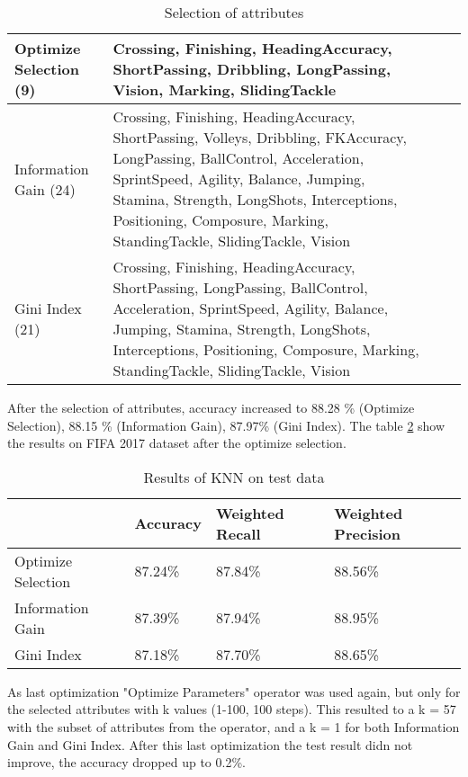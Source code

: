 \begin{table}[]
\begin{tabular}{p{3.5cm}|p{7.5cm}l|l}
\hline 
Optimize Selection (9) & Crossing, Finishing, HeadingAccuracy, ShortPassing, Dribbling, LongPassing, Vision, Marking, SlidingTackle \vspace{0.5cm}\\ 
\hline 
Information Gain (24)& Crossing, Finishing, HeadingAccuracy, ShortPassing, Volleys, Dribbling, FKAccuracy, LongPassing, BallControl, Acceleration, SprintSpeed, Agility, Balance, Jumping, Stamina, Strength, LongShots, Interceptions, Positioning, Composure, Marking, StandingTackle, SlidingTackle, Vision \vspace{0.5cm}\\ 
\hline 
Gini Index (21) & Crossing, Finishing, HeadingAccuracy, ShortPassing, LongPassing, BallControl, Acceleration, SprintSpeed, Agility, Balance, Jumping, Stamina, Strength, LongShots, Interceptions, Positioning, Composure, Marking, StandingTackle, SlidingTackle, Vision
\label{tab:knn2}
\caption{Selection of attributes}
\end{tabular}
\end{table}	

After the selection of attributes, accuracy increased to 88.28 \% (Optimize Selection), 88.15 \% (Information Gain), 87.97\% (Gini Index). The table \ref{tab:KNNResults} show the results on FIFA 2017 dataset after the optimize selection.

\begin{table}[]
\begin{tabular}{@{}llll@{}}
\toprule
                                        & Accuracy & Weighted Recall & Weighted Precision \\ \midrule
\multicolumn{1}{l|}{Optimize Selection} & 87.24\%  & 87.84\%         & 88.56\%            \\
\multicolumn{1}{l|}{Information Gain}          & 87.39\%  & 87.94\%         & 88.95\%            \\
\multicolumn{1}{l|}{Gini Index}         & 87.18\%  & 87.70\%         & 88.65\%            \\ \bottomrule
\end{tabular}
\label{tab:KNNResults}
\caption{Results of KNN on test data}
\end{table}

As last optimization "Optimize Parameters" operator was used again, but only for the selected attributes with k values (1-100, 100 steps). This resulted to a k = 57 with the subset of attributes from the operator, and a k = 1 for both Information Gain and Gini Index. After this last optimization the test result didn not improve, the accuracy dropped up to 0.2\%.
%
%

